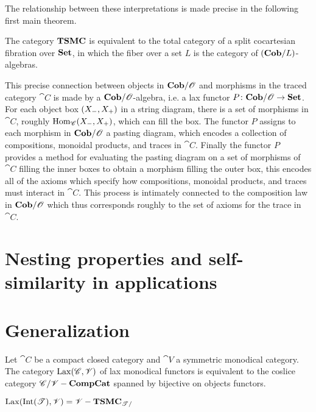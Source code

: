 The relationship between these interpretations is made precise in the following first main theorem.
\begin{theorem}
 The category $\mathbf{TSMC}$ is equivalent to the total category of a split cocartesian fibration over $\mathbf{Set}$, in which the fiber over a set $L$ is the category of $(\mathbf{Cob}/L)$-algebras.
\end{theorem}

This precise connection between objects in $\mathbf{Cob}/\mathscr{O}$ and morphisms in the traced category $\cat{C}$ is made by a $\mathbf{Cob}/\mathscr{O}$-algebra, i.e. a lax functor $P\colon\mathbf{Cob}/\mathscr{O}\to\mathbf{Set}$. For each object box $({X_-},{X_+})$ in a string diagram, there is a set of morphisms in $\cat{C}$, roughly $\operatorname{Hom}_{\mathscr{C}}({X_-},{X_+})$, which can fill the box. The functor $P$ assigns to each morphism in $\mathbf{Cob}/\mathscr{O}$ a pasting diagram, which encodes a collection of compositions, monoidal products, and traces in $\cat{C}$.  Finally the functor $P$ provides a method for evaluating the pasting diagram on a set of morphisms of $\cat{C}$ filling the inner boxes to obtain a morphism filling the outer box, this encodes all of the axioms which specify how compositions, monoidal products, and traces must interact in $\cat{C}$. This process is intimately connected to the composition law in $\mathbf{Cob}/\mathscr{O}$ which thus corresponds roughly to the set of axioms for the trace in $\cat{C}$.

\section{Nesting properties and self-similarity in applications}





\section{Generalization}

\begin{theorem}
 Let $\cat{C}$ be a compact closed category and $\cat{V}$ a symmetric monodical category.  The category $\operatorname{Lax}(\mathscr{C},\mathscr{V})$ of lax monodical functors is equivalent to the coslice category $\mathscr{C}/\mathscr{V}-\mathbf{CompCat}$ spanned by bijective on objects functors.
\end{theorem}
\begin{corollary}
 $\operatorname{Lax}(\operatorname{Int}(\mathscr{T}),\mathscr{V})=\mathscr{V}-\mathbf{TSMC}_{\mathscr{T}/}$
\end{corollary}

